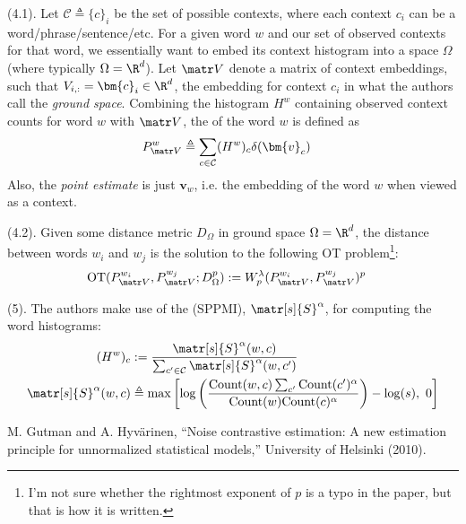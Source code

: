 \documentclass[11pt]{article}
\renewcommand\vec[2][]{\bm{#2}_{#1}}
\newcommand\myspace[1][]{\vspace{#1\bigskipamount}}
\newcommand\p{\Needspace{10\baselineskip} \noindent}
\begin{document}
\myspace
\p {} (4.1). Let $\mathcal C \triangleq \{ c  \}_i$ be the set of possible contexts, where each context $c_i$ can be a word/phrase/sentence/etc. For a given word $w$ and our set of observed contexts for that word, we essentially want to embed its context histogram into a space $\Omega$ (where typically $\Omega = \R^d$).  Let $\matr V$ denote a matrix of context embeddings, such that $V_{i,:} = \vec[i]{c} \in \R^d$, the embedding for context $c_i$ in what the authors call the \textit{ground space}. Combining the histogram $H^w$ containing observed context counts for word $w$ with $\matr V$, the  of the word $w$ is defined as
\begin{align}
	P_{\matr V}^w
		&\triangleq \sum_{c \in \mathcal C} (H^w)_c \delta(\vec[c]{v})
\end{align}
Also, the \textit{point estimate} is just $\vec[w]{v}$, i.e. the embedding of the word $w$ when viewed as a context. 

\myspace
\p {} (4.2). Given some distance metric $D_{\Omega}$ in ground space $\Omega = \R^d$, the distance between words $w_i$ and $w_j$ is the solution to the following OT problem\footnote{I'm not sure whether the rightmost exponent of $p$ is a typo in the paper, but that is how it is written.}:
\begin{align}
	\text{OT}(P_{\matr V}^{w_i},  P_{\matr V}^{w_j}; D_{\Omega}^p)
		&:= W_p^{\lambda}( P_{\matr V}^{w_i},  P_{\matr V}^{w_j}  )^p
\end{align}

\myspace
\p {} (5). The authors make use of the  (SPPMI), $\matr[s]{S}^{\alpha}$, for computing the word histograms:
\begin{align}
	(H^w)_c
		&:= \frac{
			\matr[s]{S}^{\alpha}(w, c)
		}{  
			\sum_{c' \in \mathcal C} \matr[s]{S}^{\alpha}(w, c')
		}\\
	\matr[s]{S}^{\alpha}(w, c)
		&\triangleq \max \left[ 
			\log\left(  \frac{ \text{Count}(w, c) \sum_{c'} \text{Count}(c')^{\alpha} }{  \text{Count}(w)\text{Count}(c)^{\alpha}  }   \right) - \log(s),
			~0
		\right]
\end{align}




\vspace{-1em}
{\footnotesize M. Gutman and A. Hyv\"{a}rinen, ``Noise contrastive estimation: A new estimation principle for unnormalized statistical models,'' University of Helsinki  (2010).}
\end{document}
